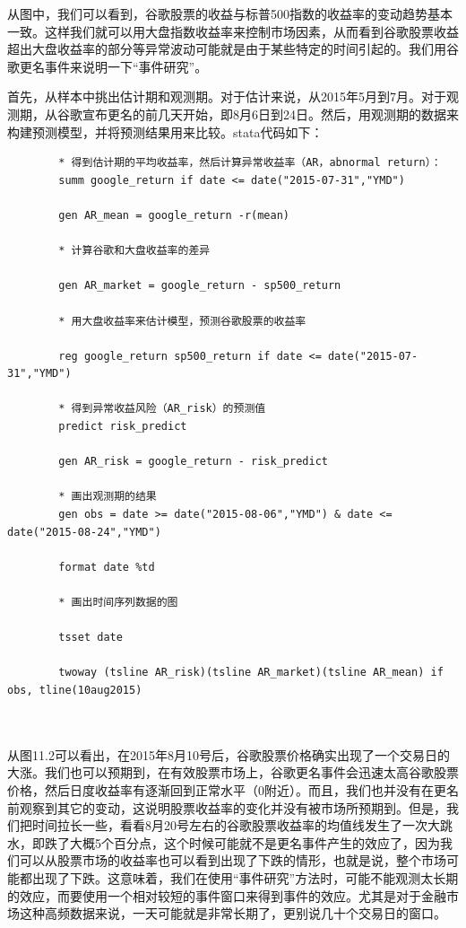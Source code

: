 \documentclass[cn,12pt,math=newtx,citestyle=gb7714-2015,bibstyle=gb7714-2015]{elegantbook}
\begin{document}
	从图中，我们可以看到，谷歌股票的收益与标普500指数的收益率的变动趋势基本一致。这样我们就可以用大盘指数收益率来控制市场因素，从而看到谷歌股票收益超出大盘收益率的部分等异常波动可能就是由于某些特定的时间引起的。我们用谷歌更名事件来说明一下“事件研究”。
	
	首先，从样本中挑出估计期和观测期。对于估计来说，从2015年5月到7月。对于观测期，从谷歌宣布更名的前几天开始，即8月6日到24日。然后，用观测期的数据来构建预测模型，并将预测结果用来比较。stata代码如下：
	
	\begin{lstlisting}
		* 得到估计期的平均收益率，然后计算异常收益率（AR，abnormal return）：
		summ google_return if date <= date("2015-07-31","YMD")
		
		gen AR_mean = google_return -r(mean)
		
		* 计算谷歌和大盘收益率的差异
		
		gen AR_market = google_return - sp500_return
		
		* 用大盘收益率来估计模型，预测谷歌股票的收益率
		
		reg google_return sp500_return if date <= date("2015-07-31","YMD")
		
		* 得到异常收益风险（AR_risk）的预测值
		predict risk_predict
		
		gen AR_risk = google_return - risk_predict
		
		* 画出观测期的结果
		gen obs = date >= date("2015-08-06","YMD") & date <= date("2015-08-24","YMD")
		
		format date %td
		
		* 画出时间序列数据的图
		
		tsset date
		
		twoway (tsline AR_risk)(tsline AR_market)(tsline AR_mean) if obs, tline(10aug2015)
		
		
	\end{lstlisting}

    从图11.2可以看出，在2015年8月10号后，谷歌股票价格确实出现了一个交易日的大涨。我们也可以预期到，在有效股票市场上，谷歌更名事件会迅速太高谷歌股票价格，然后日度收益率有逐渐回到正常水平（0附近）。而且，我们也并没有在更名前观察到其它的变动，这说明股票收益率的变化并没有被市场所预期到。但是，我们把时间拉长一些，看看8月20号左右的谷歌股票收益率的均值线发生了一次大跳水，即跌了大概5个百分点，这个时候可能就不是更名事件产生的效应了，因为我们可以从股票市场的收益率也可以看到出现了下跌的情形，也就是说，整个市场可能都出现了下跌。这意味着，我们在使用“事件研究”方法时，可能不能观测太长期的效应，而要使用一个相对较短的事件窗口来得到事件的效应。尤其是对于金融市场这种高频数据来说，一天可能就是非常长期了，更别说几十个交易日的窗口。
\end{document}
